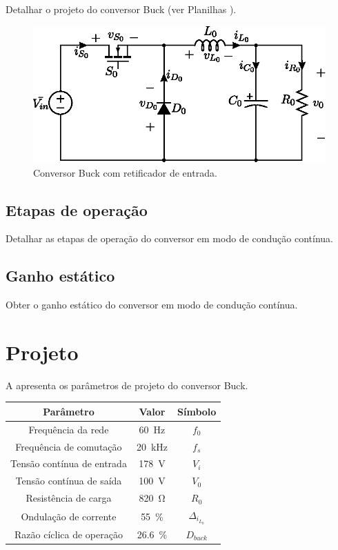 Detalhar o projeto do conversor Buck (ver Planilhas \cite{noauthor_ptc_nodate}).

\begin{figure}[!h]
	\centering
	\includegraphics[width=0.9\linewidth]{Figs/Buck}
	\caption{Conversor Buck com retificador de entrada.}
	\label{fig:buck}
\end{figure}

\subsection{Etapas de operação}
Detalhar as etapas de operação do conversor em modo de condução contínua.

\subsection{Ganho estático}
Obter o ganho estático do conversor em modo de condução contínua.

\section{Projeto}

A  apresenta os parâmetros de projeto do conversor Buck.

\begin{center}
	\label{tab:parametrosBuck}
	\begin{tabular}{@{}ccc@{}}
		\toprule
		\textbf{Parâmetro} & \textbf{Valor} & \textbf{Símbolo} \\ \midrule			
		Frequência  da rede        & \SI{60}{\hertz}     & $f_0$  \\		
		Frequência de comutação        & \SI{20}{\kilo\hertz}     & $f_s$  \\	
		Tensão contínua de entrada         &  \SI{178}{\V}      & $V_i$  \\
		Tensão contínua de saída         &  \SI{100}{\V}      & $V_0$  \\
		Resistência de carga        & \SI{820}{\ohm}      & $R_0$  \\
		Ondulação de corrente       & \SI{55}{\%}    & $\Delta_{i_{L_0}}$    \\ 
		Razão cíclica de operação       & \SI{26.6}{\%}    & $D_{buck}$    \\  \bottomrule	
	\end{tabular}
\end{center}

